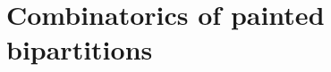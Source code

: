\documentclass[12pt,a4paper]{amsart}
\newcommand{\trivial}[2][]{\if\relax\detokenize{#1}\relax
  {%
      \color{orange} \vspace{0em} $[$  #2 $]$
      \color{black}
  }
  \else
\ifx#1h
\ifcsname showtrivial\endcsname
{%
    \color{orange} \vspace{0em}  $[$ #2 $]$
    \color{black}
}
\fi
\else {\red Wrong argument!} \fi
\fi
}
\newcommand{\CK}{{\mathcal {K}}}
\numberwithin{equation}{section}
\theoremstyle{remark}
\def\lamck{\lambda_\ckcO}
\def\Coh{\mathrm{Coh}}
\def\ev#1{{\mathrm{ev}_{#1}}}
\newcommand{\Grt}{\cK}
\begin{document}



%



\section{Combinatorics of painted bipartitions}
\end{document}
